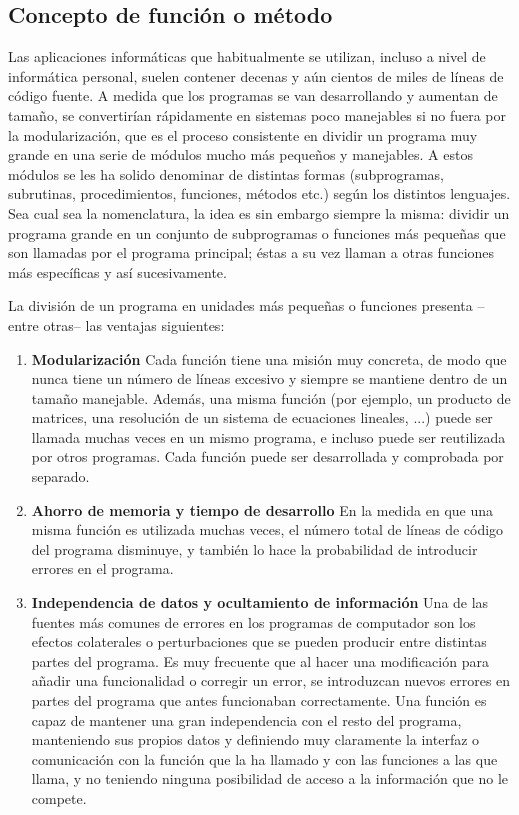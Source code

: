 \subsection{Concepto de función o método}
Las aplicaciones informáticas que habitualmente se utilizan, incluso a nivel de informática
 personal, suelen contener decenas y aún cientos de miles de líneas de código fuente. A medida
que los programas se van desarrollando y aumentan de tamaño, se convertirían rápidamente en
sistemas poco manejables si no fuera por la modularización, que es el proceso consistente en
dividir un programa muy grande en una serie de módulos mucho más pequeños y manejables.
A estos módulos se les ha solido denominar de distintas formas (subprogramas, subrutinas,
procedimientos, funciones, métodos etc.) según los distintos lenguajes. Sea cual sea la nomenclatura, la idea es sin embargo siempre
la misma: dividir un programa grande en un conjunto de subprogramas o funciones más
pequeñas que son llamadas por el programa principal; éstas a su vez llaman a otras funciones
más específicas y así sucesivamente.

La división de un programa en unidades más pequeñas o funciones presenta –entre
otras– las ventajas siguientes:

\begin{enumerate}
	\item \textbf{Modularización} Cada función tiene una misión muy concreta, de modo que nunca tiene
un número de líneas excesivo y siempre se mantiene dentro de un tamaño manejable.
Además, una misma función (por ejemplo, un producto de matrices, una resolución de
un sistema de ecuaciones lineales, ...) puede ser llamada muchas veces en un mismo
programa, e incluso puede ser reutilizada por otros programas. Cada función puede ser
desarrollada y comprobada por separado.
	\item \textbf{Ahorro de memoria y tiempo de desarrollo} En la medida en que una misma función es
utilizada muchas veces, el número total de líneas de código del programa disminuye, y
también lo hace la probabilidad de introducir errores en el programa.
	\item \textbf{Independencia de datos y ocultamiento de información} Una de las fuentes más
comunes de errores en los programas de computador son los efectos colaterales o
perturbaciones que se pueden producir entre distintas partes del programa. Es muy
frecuente que al hacer una modificación para añadir una funcionalidad o corregir un
error, se introduzcan nuevos errores en partes del programa que antes funcionaban
correctamente. Una función es capaz de mantener una gran independencia con el resto
del programa, manteniendo sus propios datos y definiendo muy claramente la interfaz o
comunicación con la función que la ha llamado y con las funciones a las que llama, y no
teniendo ninguna posibilidad de acceso a la información que no le compete.
\end{enumerate}


